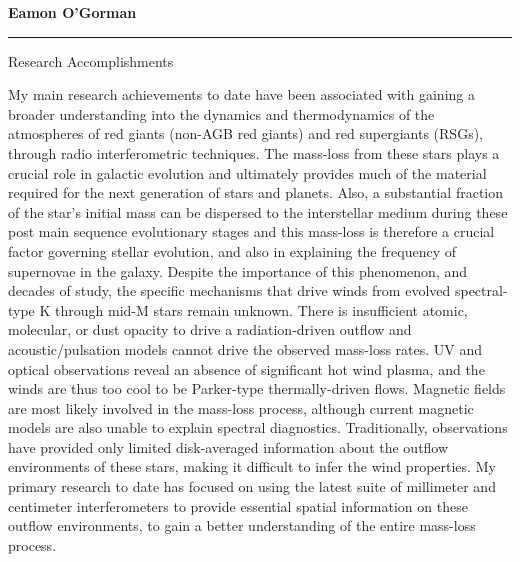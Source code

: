 \documentclass[11pt]{letter} %
\begin{document}




\begin{flushleft}
{\large\bf Eamon O'Gorman}
\end{flushleft}
\medskip\hrule height 1pt
\begin{flushright}


\end{flushright} 
{\Large 
\begin{center}
Research Accomplishments
\end{center}
}

My main research achievements to date have been associated with gaining a broader understanding into the dynamics and thermodynamics of the atmospheres of red giants (non-AGB red giants) and red supergiants (RSGs), through radio interferometric techniques. The mass-loss from these stars plays a crucial role in galactic evolution and ultimately provides much of the material required for the next generation of stars and planets. Also, a substantial fraction of the star's initial mass can be dispersed to the interstellar medium during these post main sequence evolutionary stages and this mass-loss is therefore a crucial factor governing stellar evolution, and also in explaining the frequency of supernovae in the galaxy. Despite the importance of this phenomenon, and decades of study, the specific mechanisms that drive winds from evolved spectral-type K through mid-M stars remain unknown. There is insufficient atomic, molecular, or dust opacity to drive a radiation-driven outflow and acoustic/pulsation models cannot drive the observed mass-loss rates. UV and optical observations reveal an absence of significant hot wind plasma, and the winds are thus too cool to be Parker-type thermally-driven flows. Magnetic fields are most likely involved in the mass-loss process, although current magnetic models are also unable to explain spectral diagnostics. Traditionally, observations have provided only limited disk-averaged information about the outflow environments of these stars, making it difficult to infer the wind properties. My primary research to date has focused on using the latest suite of millimeter and centimeter interferometers to provide essential spatial information on these outflow environments, to gain a better understanding of the entire mass-loss process.
\end{document}
